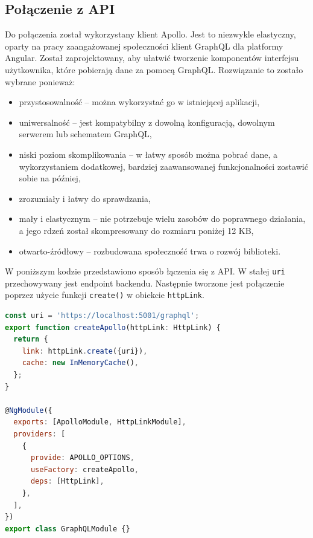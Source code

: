 \subsection{Połączenie z API}
Do połączenia został wykorzystany klient Apollo. Jest to niezwykle elastyczny, oparty na pracy zaangażowanej społeczności klient GraphQL dla platformy Angular.\cite{apollo} Został zaprojektowany, aby ułatwić tworzenie komponentów interfejsu użytkownika, które pobierają dane za pomocą GraphQL. Rozwiązanie to zostało wybrane ponieważ:
\begin{itemize}
    \item przystosowalność -- można wykorzystać go w istniejącej aplikacji,
    \item uniwersalność -- jest kompatybilny z dowolną konfiguracją, dowolnym serwerem lub schematem GraphQL,
    \item niski poziom skomplikowania -- w łatwy sposób można pobrać dane, a wykorzystaniem dodatkowej, bardziej zaawansowanej funkcjonalności zostawić sobie na później,
    \item zrozumiały i łatwy do sprawdzania,
    \item mały i elastycznym -- nie potrzebuje wielu zasobów do poprawnego działania, a jego rdzeń został skompresowany do rozmiaru poniżej 12 KB,
    \item otwarto-źródłowy -- rozbudowana społeczność trwa o rozwój biblioteki.
\end{itemize}


W poniższym kodzie przedstawiono sposób łączenia się z API. W stałej \texttt{uri} przechowywany jest endpoint backendu. Następnie tworzone jest połączenie poprzez użycie funkcji \texttt{create()} w obiekcie \texttt{httpLink}.
\begin{lstlisting}[language=JavaScript]
const uri = 'https://localhost:5001/graphql';
export function createApollo(httpLink: HttpLink) {
  return {
    link: httpLink.create({uri}),
    cache: new InMemoryCache(),
  };
}

@NgModule({
  exports: [ApolloModule, HttpLinkModule],
  providers: [
    {
      provide: APOLLO_OPTIONS,
      useFactory: createApollo,
      deps: [HttpLink],
    },
  ],
})
export class GraphQLModule {}
\end{lstlisting}

